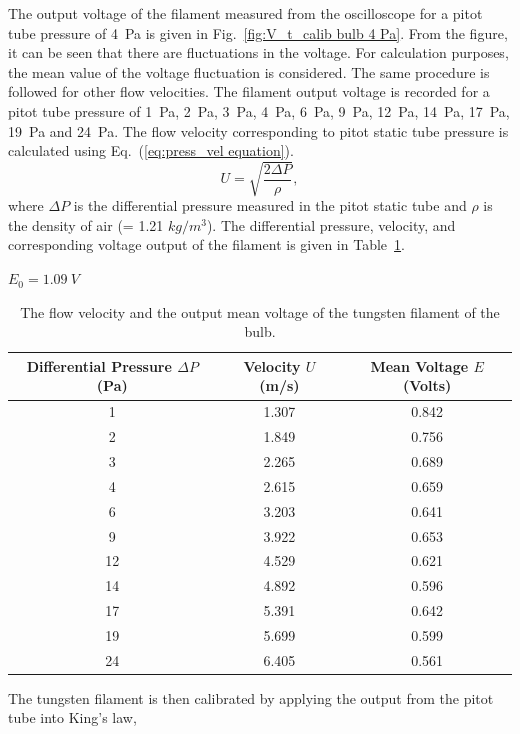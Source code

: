 The output voltage of the filament measured from the oscilloscope for a pitot tube pressure of 4~Pa is given in Fig.~\ref{fig:V_t_calib bulb 4 Pa}. From the figure, it can be seen that there are fluctuations in the voltage. For calculation purposes, the mean value of the voltage fluctuation is considered. The same procedure is followed for other flow velocities. The filament output voltage is recorded for a pitot tube pressure of 1~Pa, 2~Pa, 3~Pa, 4~Pa, 6~Pa, 9~Pa, 12~Pa, 14~Pa, 17~Pa, 19~Pa and 24~Pa. The flow velocity corresponding to pitot static tube pressure is calculated using Eq.~(\ref{eq:press_vel equation}).
\begin{equation}\label{eq:press_vel equation}
    U = \sqrt{\frac{2\Delta P}{\rho}},
\end{equation}
where $\Delta P$ is the differential pressure measured in the pitot static tube and $\rho$ is the density of air (= 1.21 $kg/m^3$). The differential pressure, velocity, and corresponding voltage output of the filament is given in Table~\ref{tab:output_bulb filament}. 
\begin{table}
$E_0 = 1.09~V$
    \centering
    \caption{The flow velocity and the output mean voltage of the tungsten filament of the bulb.}
    \begin{tabular}{|c|c|c|}
    \toprule
       \textbf{Differential Pressure $\Delta P$ (Pa)}  & \textbf{Velocity $U$ (m/s)} & \textbf{Mean Voltage $E$ (Volts)} \\
       \midrule
        1 & 1.307 & 0.842 \\ \hline
        2 & 1.849 & 0.756 \\ \hline
        3 & 2.265 & 0.689 \\ \hline
        4 & 2.615 & 0.659 \\ \hline
        6 & 3.203 & 0.641 \\ \hline
        9 & 3.922 & 0.653 \\ \hline
        12 & 4.529 & 0.621 \\ \hline
        14 & 4.892 & 0.596 \\ \hline
        17 & 5.391 & 0.642 \\ \hline
        19 & 5.699 & 0.599 \\ \hline
        24 & 6.405 & 0.561 \\ 
        \bottomrule
    \end{tabular}
    \label{tab:output_bulb filament}
\end{table}
The tungsten filament is then calibrated by applying the output from the pitot tube into King's law,
